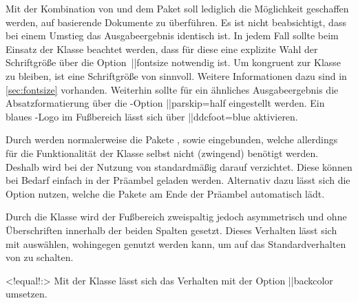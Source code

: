 \begin{DeclareEntity}{}
Mit der Kombination von  und dem Paket 
soll lediglich die Möglichkeit geschaffen werden, auf  
basierende Dokumente zu überführen. Es ist nicht beabsichtigt, dass bei einem 
Umstieg das Ausgabeergebnis identisch ist. In jedem Fall sollte beim Einsatz 
der Klasse  beachtet werden, dass für diese eine explizite 
Wahl der Schriftgröße über die Option~\Option||{fontsize} notwendig ist. Um 
kongruent zur Klasse  zu bleiben, ist eine Schriftgröße 
von  sinnvoll. Weitere Informationen dazu sind in 
\autoref{sec:fontsize} vorhanden. Weiterhin sollte für ein ähnliches 
Ausgabeergebnis die Absatzformatierung über die \KOMAScript-Option 
\Option||{parskip=half} eingestellt werden. Ein blaues \DDC-Logo im Fußbereich 
lässt sich über \Option||{ddcfoot=blue} aktivieren.

\begin{Declaration}
  {}
\printdeclarationlist
%
Durch  werden normalerweise die Pakete , 
 sowie  eingebunden, welche allerdings für 
die Funktionalität der Klasse selbst nicht (zwingend) benötigt werden. Deshalb 
wird bei der Nutzung von  standardmäßig darauf verzichtet. 
Diese können bei Bedarf einfach in der Präambel geladen werden. Alternativ 
dazu 
lässt sich die Option  nutzen, welche die Pakete am Ende 
der Präambel automatisch lädt.
\end{Declaration}

\begin{Declaration}
  {}%
\printdeclarationlist
%
Durch die Klasse  wird der Fußbereich zweispaltig jedoch 
asymmetrisch und ohne Überschriften innerhalb der beiden Spalten gesetzt. 
Dieses Verhalten lässt sich mit  auswählen, wohingegen 
 genutzt werden kann, um auf das Standardverhalten 
von  zu schalten.
\end{Declaration}

\begin{Declaration}
  {}
  <!equal!:>
\printdeclarationlist
%
Mit der Klasse  lässt sich das Verhalten mit der Option 
\Option||{backcolor} umsetzen.
\end{Declaration}


\end{DeclareEntity}
